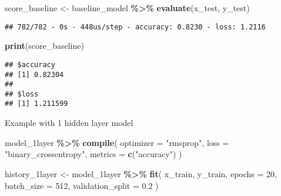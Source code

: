 \documentclass[
]{article}
\newenvironment{Shaded}{\begin{snugshade}}{\end{snugshade}}
\newcommand{\AttributeTok}[1]{\textcolor[rgb]{0.13,0.29,0.53}{#1}}
\newcommand{\DecValTok}[1]{\textcolor[rgb]{0.00,0.00,0.81}{#1}}
\newcommand{\FloatTok}[1]{\textcolor[rgb]{0.00,0.00,0.81}{#1}}
\newcommand{\FunctionTok}[1]{\textcolor[rgb]{0.13,0.29,0.53}{\textbf{#1}}}
\newcommand{\NormalTok}[1]{#1}
\newcommand{\OtherTok}[1]{\textcolor[rgb]{0.56,0.35,0.01}{#1}}
\newcommand{\SpecialCharTok}[1]{\textcolor[rgb]{0.81,0.36,0.00}{\textbf{#1}}}
\newcommand{\StringTok}[1]{\textcolor[rgb]{0.31,0.60,0.02}{#1}}
\begin{document}
\begin{Shaded}
\begin{Highlighting}[]
\NormalTok{score\_baseline }\OtherTok{\textless{}{-}}\NormalTok{ baseline\_model }\SpecialCharTok{\%\textgreater{}\%} \FunctionTok{evaluate}\NormalTok{(x\_test, y\_test)}
\end{Highlighting}
\end{Shaded}

\begin{verbatim}
## 782/782 - 0s - 448us/step - accuracy: 0.8230 - loss: 1.2116
\end{verbatim}

\begin{Shaded}
\begin{Highlighting}[]
\FunctionTok{print}\NormalTok{(score\_baseline)}
\end{Highlighting}
\end{Shaded}

\begin{verbatim}
## $accuracy
## [1] 0.82304
## 
## $loss
## [1] 1.211599
\end{verbatim}

Example with 1 hidden layer model

\begin{Shaded}
\begin{Highlighting}[]
\NormalTok{model\_1layer }\SpecialCharTok{\%\textgreater{}\%} \FunctionTok{compile}\NormalTok{(}
  \AttributeTok{optimizer =} \StringTok{"rmsprop"}\NormalTok{,}
  \AttributeTok{loss =} \StringTok{"binary\_crossentropy"}\NormalTok{,}
  \AttributeTok{metrics =} \FunctionTok{c}\NormalTok{(}\StringTok{"accuracy"}\NormalTok{)}
\NormalTok{)}

\NormalTok{history\_1layer }\OtherTok{\textless{}{-}}\NormalTok{ model\_1layer }\SpecialCharTok{\%\textgreater{}\%} \FunctionTok{fit}\NormalTok{(}
\NormalTok{  x\_train, y\_train,}
  \AttributeTok{epochs =} \DecValTok{20}\NormalTok{,}
  \AttributeTok{batch\_size =} \DecValTok{512}\NormalTok{,}
  \AttributeTok{validation\_split =} \FloatTok{0.2}
\NormalTok{)}
\end{Highlighting}
\end{Shaded}
\end{document}
